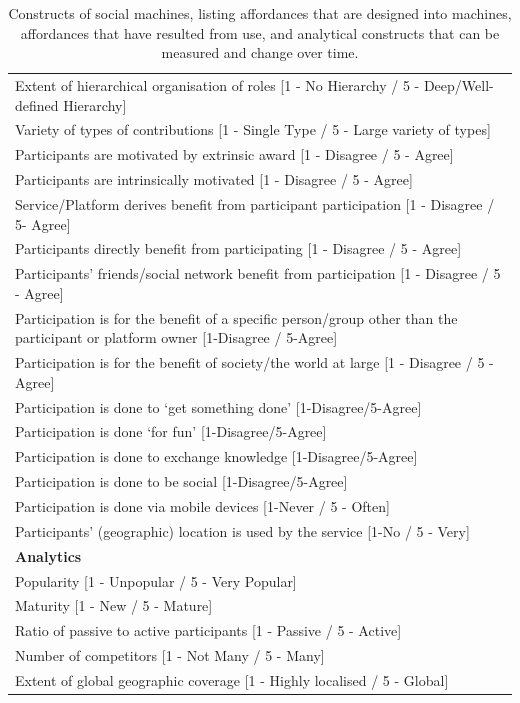 \documentclass{sig-alternate}
\begin{document}
\begin{table}[htbp]
\begin{center}
\begin{tabular}{|p{18cm}|}
	Extent of hierarchical organisation of roles [1 - No Hierarchy / 5 - Deep/Well-defined Hierarchy] \\
Variety of types of contributions [1 - Single Type / 5 - Large variety of types] \\
Participants are motivated by extrinsic award  [1 - Disagree / 5 - Agree] \\
Participants are intrinsically motivated [1 - Disagree / 5 - Agree] \\
Service/Platform derives benefit from participant participation [1 - Disagree /  5- Agree] \\
Participants directly benefit from participating [1 - Disagree / 5 - Agree] \\
Participants' friends/social network benefit from participation [1 - Disagree / 5 - Agree] \\
Participation is for the benefit of a specific person/group other than the participant or platform owner [1-Disagree / 5-Agree] \\
Participation is for the benefit of society/the world at large  [1 - Disagree / 5 - Agree] \\
Participation is done to `get something done' [1-Disagree/5-Agree] \\
Participation is done `for fun' [1-Disagree/5-Agree] \\
Participation is done to exchange knowledge [1-Disagree/5-Agree] \\
Participation is done to be social [1-Disagree/5-Agree] \\
Participation is done via mobile devices [1-Never / 5 - Often] \\
Participants' (geographic) location is used by the service [1-No / 5 - Very] \\
\hline
{\bf Analytics} \\
\hline
Popularity [1 - Unpopular / 5 - Very Popular] \\
Maturity [1 - New / 5 - Mature] \\
Ratio of passive to active participants [1 - Passive / 5 - Active] \\
Number of competitors [1 - Not Many / 5 - Many] \\
Extent of global geographic coverage [1 - Highly localised / 5 - Global]\\
\hline
\end{tabular}
\end{center}
\caption{Constructs of social machines, listing affordances that are designed into machines, affordances that have resulted from use, and analytical constructs that can be measured and change over time.} \label{table:constructs}
\end{table}%
\end{document}

